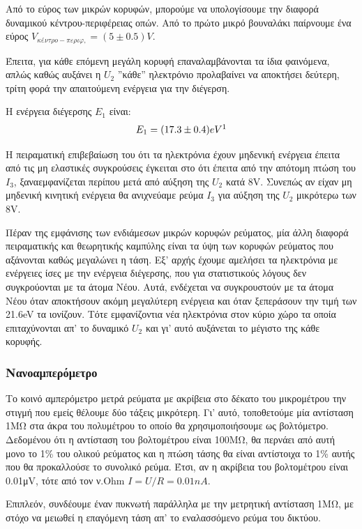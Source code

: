 \documentclass[a4paper]{article}
\begin{document}
	Από το εύρος των μικρών κορυφών, μπορούμε να υπολογίσουμε την διαφορά δυναμικού κέντρου-περιφέρειας οπών. Από το πρώτο μικρό βουναλάκι παίρνουμε ένα εύρος $V_{κέντρο-περιφ,} = (5\pm0.5)V$.
	
	Έπειτα, για κάθε επόμενη μεγάλη κορυφή επαναλαμβάνονται τα ίδια φαινόμενα, απλώς καθώς αυξάνει η $U_2$ ''κάθε'' ηλεκτρόνιο προλαβαίνει να αποκτήσει δεύτερη, τρίτη φορά την απαιτούμενη ενέργεια για την διέγερση.
	
	Η ενέργεια διέγερσης $Ε_1$ είναι:%
	\begin{align*}
		E_1 = ( 17.3 \pm 0.4 ) eV\footnotemark
	\end{align*}
	
	Η πειραματική επιβεβαίωση του ότι τα ηλεκτρόνια έχουν μηδενική ενέργεια έπειτα από τις μη ελαστικές συγκρούσεις έγκειται στο ότι έπειτα από την απότομη πτώση του $I_3$, ξαναεμφανίζεται περίπου μετά από αύξηση της $U_2$ κατά 8V. Συνεπώς αν είχαν μη μηδενική κινητική ενέργεια θα ανιχνεύαμε ρεύμα $I_3$ για αύξηση της $U_2$ μικρότερω των 8V. 
	
	Πέραν της εμφάνισης των ενδιάμεσων μικρών κορυφών ρεύματος, μία άλλη διαφορά πειραματικής και θεωρητικής καμπύλης είναι τα ύψη των κορυφών ρεύματος που αξάνονται καθώς μεγαλώνει η τάση. Εξ' αρχής έχουμε αμελήσει τα ηλεκτρόνια με ενέργειες ίσες με την ενέργεια διέγερσης, που για στατιστικούς λόγους δεν συγκρούονται με τα άτομα Νέου. Αυτά, ενδέχεται να συγκρουστούν με τα άτομα Νέου όταν αποκτήσουν ακόμη μεγαλύτερη ενέργεια και όταν ξεπεράσουν την τιμή των 21.6eV τα ιονίζουν. Τότε εμφανίζοντια νέα ηλεκτρόνια στον κύριο χώρο τα οποία επιταχύνονται απ' το δυναμικό $U_2$ και γι' αυτό αυξάνεται το μέγιστο της κάθε κορυφής.
	
	\subsubsection*{Νανοαμπερόμετρο}
	
	Το κοινό αμπερόμετρο μετρά ρεύματα με ακρίβεια στο δέκατο του μικρομέτρου την στιγμή που εμείς θέλουμε δύο τάξεις μικρότερη. Γι' αυτό, τοποθετούμε μία αντίσταση 1ΜΩ στα άκρα του πολυμέτρου το οποίο θα χρησιμοποιήσουμε ως βολτόμετρο. Δεδομένου ότι η αντίσταση του βολτομέτρου είναι 100ΜΩ, θα περνάει από αυτή μονο το 1\% του ολικού ρεύματος και η πτώση τάσης θα είναι αντίστοιχα το 1\% αυτής που θα προκαλλούσε το συνολικό ρεύμα. Έτσι, αν η ακρίβεια του βολτομέτρου είναι 0.01μV, τότε από τον ν.Ohm $I=U/R =0.01nA$. 
	
	Επιπλεόν, συνδέουμε έναν πυκνωτή παράλληλα με την μετρητική αντίσταση 1ΜΩ, με στόχο να μειωθεί η επαγόμενη τάση απ' το εναλασσόμενο ρεύμα του δικτύου.
\end{document}
